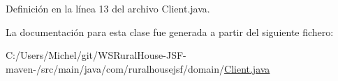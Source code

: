 Definición en la línea 13 del archivo Client.\+java.



La documentación para esta clase fue generada a partir del siguiente fichero\+:\begin{DoxyCompactItemize}
\item 
C\+:/\+Users/\+Michel/git/\+W\+S\+Rural\+House-\/\+J\+S\+F-\/maven-\//src/main/java/com/ruralhousejsf/domain/\mbox{\hyperlink{_client_8java}{Client.\+java}}\end{DoxyCompactItemize}
